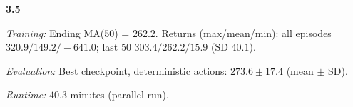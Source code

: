 \noindent\textbf{3.5}\par
\emph{Training:} Ending MA(50) = $262.2$. Returns (max/mean/min): all episodes $320.9/149.2/-641.0$; last 50 $303.4/262.2/15.9$ (SD $40.1$).\par
\emph{Evaluation:} Best checkpoint, deterministic actions: $273.6\pm 17.4$ (mean $\pm$ SD).\par
\emph{Runtime:} $40.3$ minutes (parallel run).\par
